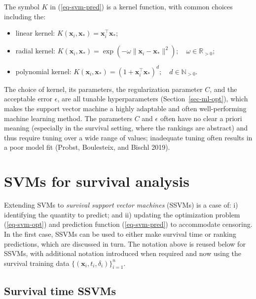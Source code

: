 \documentclass[
  letterpaper,
  krantz2]{style/krantz}
\providecommand{\tightlist}{%
  \setlength{\itemsep}{0pt}\setlength{\parskip}{0pt}}
\begin{document}
The symbol \(K\) in (\ref{eq-svm-pred}) is a kernel function, with
common choices including
the:

\begin{itemize}
\tightlist
\item
  linear kernel:
  \(K(\mathbf{x}_i, \mathbf{x}_*) = \mathbf{x}_i^\top\mathbf{x}_*\);
\item
  radial kernel:
  \(K(\mathbf{x}_i, \mathbf{x}_*) = \exp(-\omega\|\mathbf{x}_i - \mathbf{x}_*\|^2); \quad \omega \in \mathbb{R}_{>0}\);
\item
  polynomial kernel:
  \(K(\mathbf{x}_i, \mathbf{x}_*) = (1 + \mathbf{x}_i^\top\mathbf{x}_*)^d; \quad d \in \mathbb{N}_{> 0}\).
\end{itemize}

The choice of kernel, its parameters, the regularization parameter
\(C\), and the acceptable error \(\epsilon\), are all tunable
hyperparameters (Section~\ref{sec-ml-opt}), which makes the support
vector machine a highly adaptable and often well-performing machine
learning method. The parameters \(C\) and
\(\epsilon\) often have no clear a priori meaning (especially in the
survival setting, where the rankings are abstract) and thus require
tuning over a wide range of values; inadequate tuning often results in a
poor model fit (Probst, Boulesteix, and Bischl 2019).

\section{SVMs for survival analysis}\label{sec-surv-ml-models-svm-surv}

Extending SVMs to \emph{survival support vector machines} (SSVMs) is a
case of: i) identifying the quantity to predict; and ii) updating the
optimization problem (\ref{eq-svm-opt}) and prediction function
(\ref{eq-svm-pred}) to accommodate
censoring. In the first case,
SSVMs can be used to either make survival time or ranking predictions,
which are discussed in turn. The notation above is reused below for
SSVMs, with additional notation introduced when required and now using
the survival training data
\(\{(\mathbf{x}_i, t_i, \delta_i)\}^n_{i=1}\).

\subsection{Survival time SSVMs}\label{survival-time-ssvms}
\end{document}
